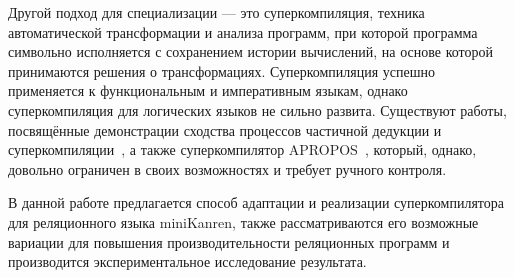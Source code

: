 Другой подход для специализации --- это суперкомпиляция, 
техника автоматической трансформации и анализа программ,
при которой программа символьно исполняется с сохранением истории вычислений,
на основе которой принимаются решения о трансформациях.
Суперкомпиляция успешно применяется к функциональным и императивным языкам,
однако суперкомпиляция для логических языков не сильно развита. Существуют
работы, посвящённые демонстрации сходства процессов частичной дедукции и суперкомпиляции~\cite{pdAndDriving},
а также суперкомпилятор APROPOS~\cite{apropos}, который, однако, довольно ограничен
в своих возможностях и требует ручного контроля.

В данной работе предлагается способ адаптации и реализации суперкомпилятора для
реляционного языка miniKanren, также рассматриваются его возможные вариации для
повышения производительности реляционных программ и производится экспериментальное
исследование результата.
